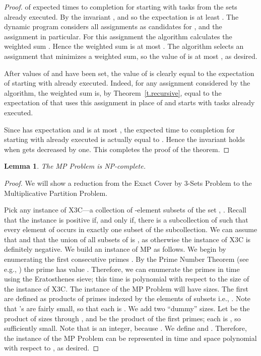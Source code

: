\documentclass[letterpaper,11pt]{article}
\newtheorem{lemma}[theorem]{Lemma}
\begin{document}
{\begin{proof}
of expected times  to completion for  starting with tasks from the sets  already executed. By the invariant , and so the expectation  is at least . The dynamic program considers all assignments as candidates for , and the assignment  in particular. For this assignment the algorithm calculates the weighted sum . Hence the weighted sum is at most . The algorithm selects an assignment that minimizes a weighted sum, so the value of  is at most , as desired.

After values of  and  have been set, the value of  is clearly equal to the expectation of  starting with  already executed. Indeed, for any assignment considered by the algorithm, the weighted sum is, by Theorem~\ref{t.recursive}, equal to the expectation of  that uses this assignment in place of  and starts with tasks  already executed.

Since  has expectation  and  is at most , the expected time to completion for  starting with  already executed is actually equal to . Hence the invariant holds when  gets decreased by one. This completes the proof of the theorem. 
\end{proof}


\renewcommand{\thetheorem}{4.1}

\begin{lemma}
The MP Problem is NP-complete.
\end{lemma}

\begin{proof}
We will show a reduction from the Exact Cover by 3-Sets Problem to the Multiplicative Partition Problem.

Pick any instance of X3C---a collection  of -element subsets of the set , . Recall that the instance is positive if, and only if, there is a subcollection of  such that every element of  occurs in exactly one subset of the subcollection. We can assume that  and that the union of all subsets of  is , as otherwise the instance of X3C is definitely negative.
We build an instance of MP as follows. We begin by enumerating the first consecutive primes . By the Prime Number Theorem (see e.g., \cite{IR90}) the prime  has value . Therefore, we can enumerate the primes in time  using the Eratosthenes sieve; this time is polynomial with respect to the size of the instance of X3C. 
The instance of the MP Problem will have  sizes. The first  are defined as products of primes indexed by the elements of subsets i.e., . Note that 's are fairly small, so that each  is . 
We add two ``dummy'' sizes. Let  be the product of sizes  through , and  be the product of the first  primes; each is , so sufficiently small. Note that  is an integer, because . We define  and . Therefore, the instance of the MP Problem can be represented in time and space polynomial with respect to , as desired.


\end{proof}}
\end{document}
